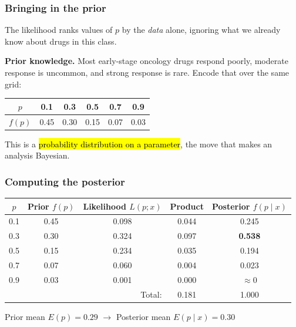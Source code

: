 \documentclass[slidestop,compress,mathserif]{beamer}
\begin{document}
\begin{frame}
\frametitle{Bringing in the prior}

The likelihood ranks values of $p$ by the \emph{data} alone, ignoring what we already know about drugs in this class.

\pause
\medskip
\textbf{Prior knowledge.} Most early-stage oncology drugs respond poorly, moderate response is uncommon, and strong response is rare. Encode that over the same grid:

\begin{center}
\renewcommand{\arraystretch}{1.1}
\begin{tabular}{c|ccccc}
\toprule
$p$     & 0.1  & 0.3  & 0.5  & 0.7  & 0.9  \\
\midrule
$f(p)$  & 0.45 & 0.30 & 0.15 & 0.07 & 0.03 \\
\bottomrule
\end{tabular}
\end{center}

\pause
This is a \hl{probability distribution on a parameter}, the move that makes an analysis Bayesian.

\end{frame}

\begin{frame}
\frametitle{Computing the posterior}

\vspace{0.35em}
\begin{center}
\renewcommand{\arraystretch}{1.15}
\begin{tabular}{c c c c c}
\toprule
$p$ & Prior $f(p)$ & Likelihood $L(p ; x)$ & Product & Posterior $f(p\mid x)$ \\
\midrule
0.1 & 0.45 & 0.098 & 0.044 & 0.245 \\
0.3 & 0.30 & 0.324 & 0.097 & \textbf{0.538} \\
0.5 & 0.15 & 0.234 & 0.035 & 0.194 \\
0.7 & 0.07 & 0.060 & 0.004 & 0.023 \\
0.9 & 0.03 & 0.001 & 0.000 & $\approx 0$ \\
\midrule
\multicolumn{3}{r}{Total:} & 0.181 & 1.000 \\
\bottomrule
\end{tabular}
\end{center}
\pause
\begin{center}
\small Prior mean $E(p) = 0.29$ \hspace{1.5em} $\longrightarrow$ \hspace{1.5em} Posterior mean $E(p \mid x) = 0.30$
\end{center}
\end{frame}
\end{document}
